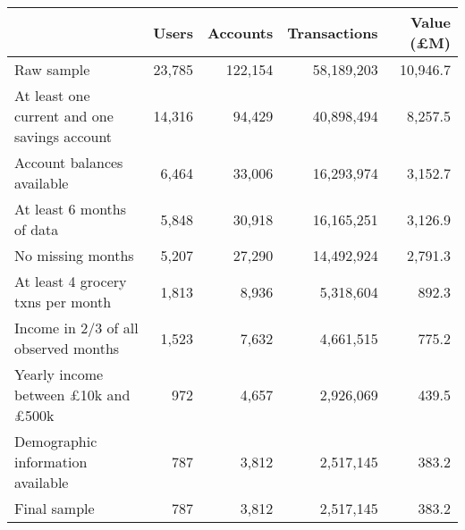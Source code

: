 \begin{tabular}{lrrrr}
\toprule
                                                 &  Users & Accounts & Transactions & Value (\pounds M) \\
\midrule
                                      Raw sample & 23,785 &  122,154 &   58,189,203 &          10,946.7 \\
    At least one current and one savings account & 14,316 &   94,429 &   40,898,494 &           8,257.5 \\
                      Account balances available &  6,464 &   33,006 &   16,293,974 &           3,152.7 \\
                       At least 6 months of data &  5,848 &   30,918 &   16,165,251 &           3,126.9 \\
                               No missing months &  5,207 &   27,290 &   14,492,924 &           2,791.3 \\
               At least 4 grocery txns per month &  1,813 &    8,936 &    5,318,604 &             892.3 \\
            Income in 2/3 of all observed months &  1,523 &    7,632 &    4,661,515 &             775.2 \\
Yearly income between \pounds10k and \pounds500k &    972 &    4,657 &    2,926,069 &             439.5 \\
               Demographic information available &    787 &    3,812 &    2,517,145 &             383.2 \\
                                    Final sample &    787 &    3,812 &    2,517,145 &             383.2 \\
\bottomrule
\end{tabular}
